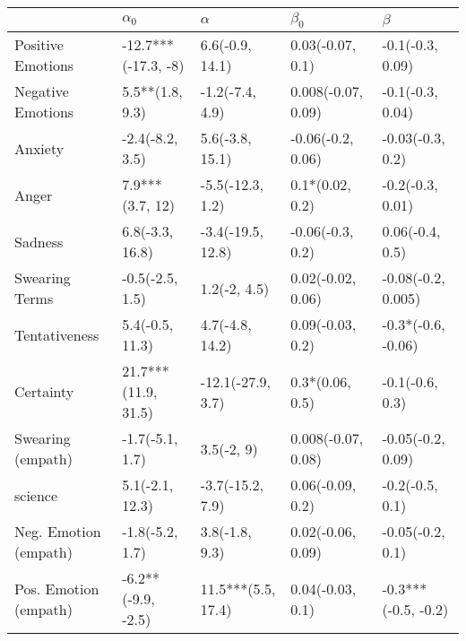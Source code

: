 \begin{tabular}{lllll}
\toprule
{} &           $\alpha_0$ &            $\alpha$ &           $\beta_0$ &              $\beta$ \\
\midrule
Positive Emotions     &  -12.7***(-17.3, -8) &     6.6(-0.9, 14.1) &    0.03(-0.07, 0.1) &     -0.1(-0.3, 0.09) \\
Negative Emotions     &      5.5**(1.8, 9.3) &     -1.2(-7.4, 4.9) &  0.008(-0.07, 0.09) &     -0.1(-0.3, 0.04) \\
Anxiety               &      -2.4(-8.2, 3.5) &     5.6(-3.8, 15.1) &   -0.06(-0.2, 0.06) &     -0.03(-0.3, 0.2) \\
Anger                 &      7.9***(3.7, 12) &    -5.5(-12.3, 1.2) &     0.1*(0.02, 0.2) &     -0.2(-0.3, 0.01) \\
Sadness               &      6.8(-3.3, 16.8) &   -3.4(-19.5, 12.8) &    -0.06(-0.3, 0.2) &      0.06(-0.4, 0.5) \\
Swearing Terms        &      -0.5(-2.5, 1.5) &        1.2(-2, 4.5) &   0.02(-0.02, 0.06) &   -0.08(-0.2, 0.005) \\
Tentativeness         &      5.4(-0.5, 11.3) &     4.7(-4.8, 14.2) &    0.09(-0.03, 0.2) &   -0.3*(-0.6, -0.06) \\
Certainty             &  21.7***(11.9, 31.5) &   -12.1(-27.9, 3.7) &     0.3*(0.06, 0.5) &      -0.1(-0.6, 0.3) \\
Swearing (empath)     &      -1.7(-5.1, 1.7) &          3.5(-2, 9) &  0.008(-0.07, 0.08) &    -0.05(-0.2, 0.09) \\
science               &      5.1(-2.1, 12.3) &    -3.7(-15.2, 7.9) &    0.06(-0.09, 0.2) &      -0.2(-0.5, 0.1) \\
Neg. Emotion (empath) &      -1.8(-5.2, 1.7) &      3.8(-1.8, 9.3) &   0.02(-0.06, 0.09) &     -0.05(-0.2, 0.1) \\
Pos. Emotion (empath) &   -6.2**(-9.9, -2.5) &  11.5***(5.5, 17.4) &    0.04(-0.03, 0.1) &  -0.3***(-0.5, -0.2) \\
\bottomrule
\end{tabular}
